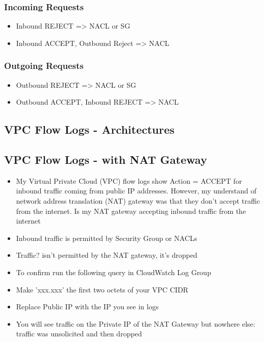 \subsubsection{Incoming Requests}
\begin{itemize}
    \item Inbound REJECT => NACL or SG
    \item Inbound ACCEPT, Outbound Reject => NACL
\end{itemize}

\subsubsection{Outgoing Requests}
\begin{itemize}
    \item Outbound REJECT => NACL or SG
    \item Outbound ACCEPT, Inbound REJECT => NACL
\end{itemize}

\subsection{VPC Flow Logs - Architectures}

\subsection{VPC Flow Logs - with NAT Gateway}
\begin{itemize}
    \item My Virtual Private Cloud (VPC) flow logs show Action = ACCEPT for inbound traffic coming from public IP addresses.
    However, my understand of network address translation (NAT) gateway was that they don't accept traffic from the internet.
    Is my NAT gateway accepting inbound traffic from the internet
    \item Inbound traffic is permitted by Security Group or NACLs
    \item Traffic? isn't permitted by the NAT gateway, it's dropped
    \item To confirm run the following query in CloudWatch Log Group
    \item Make 'xxx.xxx' the first two octets of your VPC CIDR
    \item Replace Public IP with the IP you see in logs
    \item You will see traffic on the Private IP of the NAT Gateway but nowhere else: traffic was unsolicited and then dropped
\end{itemize}


